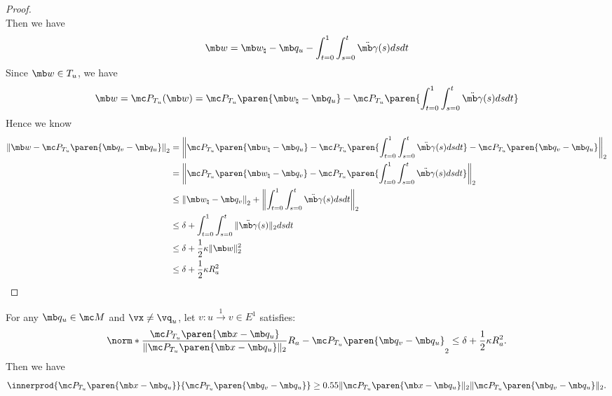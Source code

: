 \begin{proof}
\begin{equation}
\end{equation}
Then we have
\begin{equation}
    \begin{aligned}
        \mb w = \mb w_\natural - \mb q_u - \int_{t=0}^1 \int_{s=0}^t \ddot{\mb\gamma}(s) ds dt
    \end{aligned}
\end{equation}
Since $\mb w \in T_u$, we have
\begin{equation}
    \begin{aligned}
        \mb w = \mc P_{T_u} (\mb w)
        = \mc P_{T_u} \paren{\mb w_\natural - \mb q_u} - \mc P_{T_u} \paren{\int_{t=0}^1 \int_{s=0}^t \ddot{\mb\gamma}(s) ds dt}
    \end{aligned}
\end{equation}
Hence we know
\begin{equation}
    \begin{aligned}
    \left\| \mb w - \mc P_{T_u} \paren{\mb q_v - \mb q_u}\right\|_2
        &= \left\| \mc P_{T_u}\paren{\mb w_\natural - \mb q_u} - \mc P_{T_u} \paren{\int_{t=0}^1 \int_{s=0}^t \ddot{\mb\gamma}(s) ds dt} - \mc P_{T_u} \paren{\mb q_v - \mb q_u} \right\|_2\\
        &= \left\| \mc P_{T_u} \paren{\mb w_\natural - \mb q_v} - \mc P_{T_u} \paren{\int_{t=0}^1 \int_{s=0}^t \ddot{\mb\gamma}(s) ds dt}\right\|_2\\
        &\leq \left\| \mb w_\natural - \mb q_v \right\|_2 + \left\| \int_{t=0}^1 \int_{s=0}^t \ddot{\mb\gamma}(s) ds dt\right\|_2\\
        &\leq \delta + \int_{t=0}^1 \int_{s=0}^t \| \ddot{\mb\gamma}(s)\|_2 ds dt\\
        &\leq \delta + \frac{1}{2} \kappa \|\mb w\|_2^2\\
        &\leq \delta + \frac{1}{2} \kappa R_a^2
    \end{aligned}
\end{equation}
\end{proof}

\begin{lemma}\label{lem:bound dot product of gradient and edge in tangent direction}
    For any $\mb q_u\in \mc M$ and $\vx \ne \vq_u$, let $v: u\overset{1}{\rightarrow} v \in E^1$ satisfies:
    \begin{align}\label{eq:app:bound_dot_prod_grad_edge_tangent_dir_condition}
        \norm*{ \frac{\mc P_{T_u} \paren{\mb x - \mb q_u}}{\| \mc P_{T_u} \paren{\mb x - \mb q_u}\|_2} R_a - \mc P_{T_u} \paren{\mb q_v - \mb q_u}}_2 \le \delta + \frac{1}{2}\kappa R_a^2.
    \end{align}
    Then we have
    \begin{equation}
         \innerprod{\mc P_{T_u} \paren{\mb x - \mb q_u}}{\mc P_{T_u}\paren{\mb q_v - \mb q_u}}
        \ge 0.55
        \| \mc P_{T_u} \paren{\mb x - \mb q_u} \|_2   \| \mc P_{T_u}\paren{\mb q_v - \mb q_u} \|_2. 
    \end{equation}
\end{lemma}


